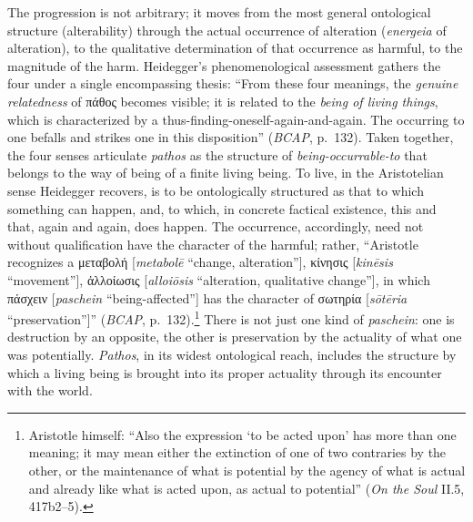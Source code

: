 \documentclass{article}
\newcommand{\gk}[1]{{\greekfont #1}}
\begin{document}
The progression is not arbitrary; it moves from the most general ontological structure (alterability) through the actual occurrence of alteration (\textit{energeia} of alteration), to the qualitative determination of that occurrence as harmful, to the magnitude of the harm. Heidegger's phenomenological assessment gathers the four under a single encompassing thesis: ``From these four meanings, the \textit{genuine relatedness} of \gk{πάθος} becomes visible; it is related to the \textit{being of living things}, which is characterized by a thus-finding-oneself-again-and-again. The occurring to one befalls and strikes one in this disposition'' (\textit{BCAP}, p.~132). Taken together, the four senses articulate \textit{pathos} as the structure of \textit{being-occurrable-to} that belongs to the way of being of a finite living being. To live, in the Aristotelian sense Heidegger recovers, is to be ontologically structured as that to which something can happen, and, to which, in concrete factical existence, this and that, again and again, does happen. The occurrence, accordingly, need not without qualification have the character of the harmful; rather, ``Aristotle recognizes a \gk{μεταβολή} [\textit{metabolē} ``change, alteration''], \gk{κίνησις} [\textit{kinēsis} ``movement''], \gk{ἀλλοίωσις} [\textit{alloiōsis} ``alteration, qualitative change''], in which \gk{πάσχειν} [\textit{paschein} ``being-affected''] has the character of \gk{σωτηρία} [\textit{sōtēria} ``preservation'']'' (\textit{BCAP}, p.~132).\footnote{Aristotle himself: ``Also the expression `to be acted upon' has more than one meaning; it may mean either the extinction of one of two contraries by the other, or the maintenance of what is potential by the agency of what is actual and already like what is acted upon, as actual to potential'' (\textit{On the Soul} II.5, 417b2--5).} There is not just one kind of \textit{paschein}: one is destruction by an opposite, the other is preservation by the actuality of what one was potentially. \textit{Pathos}, in its widest ontological reach, includes the structure by which a living being is brought into its proper actuality through its encounter with the world.
\end{document}
